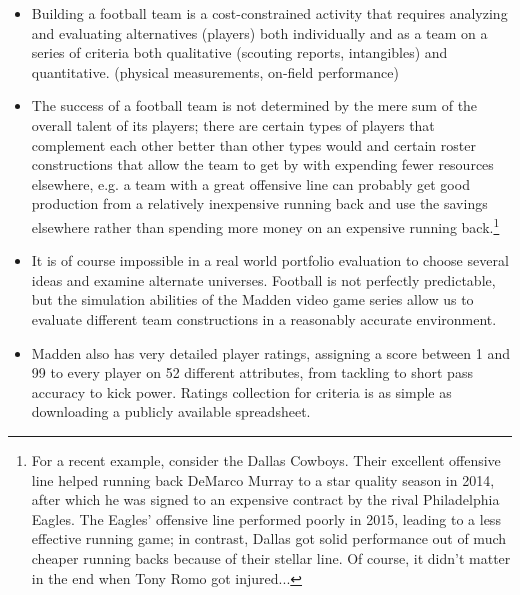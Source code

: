 \documentclass[11pt]{article}
\begin{document}
\begin{itemize}
	\item Building a football team is a cost-constrained activity that requires analyzing and evaluating alternatives (players) both individually and as a team on a series of criteria both qualitative (scouting reports, intangibles) and quantitative. (physical measurements, on-field performance)
	\item The success of a football team is not determined by the mere sum of the overall talent of its players; there are certain types of players that complement each other better than other types would and certain roster constructions that allow the team to get by with expending fewer resources elsewhere, e.g. a team with a great offensive line can probably get good production from a relatively inexpensive running back and use the savings elsewhere rather than spending more money on an expensive running back.\footnote{For a recent example, consider the Dallas Cowboys. Their excellent offensive line helped running back DeMarco Murray to a star quality season in 2014, after which he was signed to an expensive contract by the rival Philadelphia Eagles. The Eagles' offensive line performed poorly in 2015, leading to a less effective running game; in contrast, Dallas got solid performance out of much cheaper running backs because of their stellar line. Of course, it didn't matter in the end when Tony Romo got injured...}
	\item It is of course impossible in a real world portfolio evaluation to choose several ideas and examine alternate universes. Football is not perfectly predictable, but the simulation abilities of the Madden video game series allow us to evaluate different team constructions in a reasonably accurate environment.
	\item Madden also has very detailed player ratings, assigning a score between 1 and 99 to every player on 52 different attributes, from tackling to short pass accuracy to kick power. Ratings collection for criteria is as simple as downloading a publicly available spreadsheet.
\end{itemize}
\end{document}
